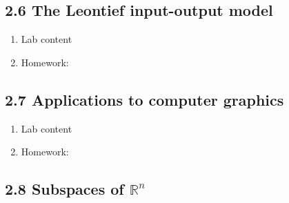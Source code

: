 \documentclass{article}
\begin{document}
\subsection{2.6 The Leontief input-output model}

\begin{enumerate}

\item Lab content


\item Homework: 

\end{enumerate}

\subsection{2.7 Applications to computer graphics}

\begin{enumerate}

\item Lab content

\item Homework: 

\end{enumerate}

\subsection{2.8 Subspaces of $\mathbb{R}^n$}
\end{document}
